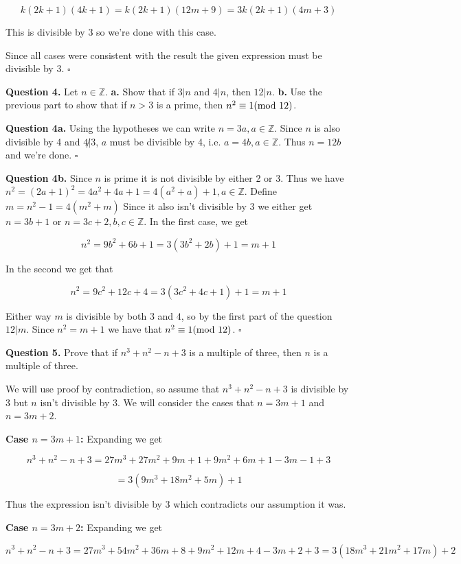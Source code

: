 \documentclass[letterpaper, reqno,11pt]{article}
\newcommand{\ZZ}{\mathbb{Z}}
\begin{document}
$$
    k(2k+1)(4k+1)=k(2k+1)(12m+9)=3k(2k+1)(4m+3)
$$

This is divisible by 3 so we're done with this case. 

Since all cases were consistent with the result the given expression must be divisible by $3$. $\square$

{\noindent\bf Question 4.} Let $n\in\ZZ$. {\bf a.} Show that if $3|n$ and $4|n$, then $12|n$. {\bf b.} Use the previous part to show that if $n>3$ is a prime, then $n^2\equiv 1(\textnormal{mod }12)$. 

\medskip

{\noindent\bf Question 4a.} Using the hypotheses we can write $n=3a, a\in\ZZ$. Since $n$ is also divisible by 4 and $4\not|3$, $a$ must be divisible by 4, i.e. $a=4b, a\in\ZZ$. Thus $n=12b$ and we're done. $\square$

{\noindent\bf Question 4b.} Since $n$ is prime it is not divisible by either 2 or 3. Thus we have $n^2=(2a+1)^2=4a^2+4a+1=4(a^2+a)+1, a\in\ZZ$. Define $m=n^2-1=4(m^2+m)$ Since it also isn't divisible by $3$ we either get $n=3b+1$ or $n=3c+2,b, c\in\ZZ$. In the first case, we get

$$
    n^2=9b^2+6b+1=3(3b^2+2b)+1=m+1
$$

In the second we get that 

$$
    n^2=9c^2+12c+4=3(3c^2+4c+1)+1=m+1
$$

Either way $m$ is divisible by both $3$ and $4$, so by the first part of the question $12|m$. Since $n^2=m+1$ we have that $n^2\equiv1(\textnormal{mod } 12)$. $\square$

{\noindent\bf Question 5.} Prove that if $n^3+n^2-n+3$ is a multiple of three, then $n$ is a multiple of three. 

\medskip

We will use proof by contradiction, so assume that $n^3+n^2-n+3$ is divisible by 3 but $n$ isn't divisible by $3$. We will consider the cases that $n=3m+1$ and $n=3m+2$. 

{\bf Case $n=3m+1$:} Expanding we get 

$$
    n^3+n^2-n+3=27m^3+27m^2+9m+1+9m^2+6m+1-3m-1+3
$$

$$
    =3(9m^3+18m^2+5m)+1
$$

Thus the expression isn't divisible by $3$ which contradicts our assumption it was. 

{\bf Case $n=3m+2$:} Expanding we get 

$$
    n^3+n^2-n+3=27m^3+54m^2+36m+8+9m^2+12m+4-3m+2+3=3(18m^3+21m^2+17m)+2
$$
\end{document}
